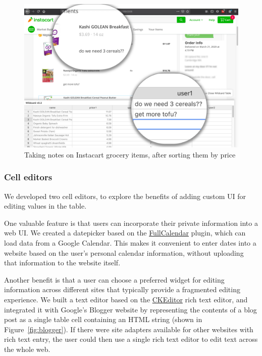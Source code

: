 \documentclass[sigplan,screen,10pt,anonymous,review]{acmart}
\begin{document}
\begin{figure}
\hypertarget{fig:instacart}{%
\centering
\includegraphics[width=\columnwidth]{media/instacart.png}
\caption{Taking notes on Instacart grocery items, after sorting them by price}\label{fig:instacart}
}
\end{figure}

\hypertarget{cell-editors}{%
\subsubsection{Cell editors}\label{cell-editors}}

We developed two cell editors, to explore the benefits of adding custom
UI for editing values in the table.

One valuable feature is that users can incorporate their private
information into a web UI. We created a datepicker based on the
\href{https://fullcalendar.io/}{FullCalendar} plugin, which can load
data from a Google Calendar. This makes it convenient to enter dates
into a website based on the user's personal calendar information,
without uploading that information to the website itself.

Another benefit is that a user can choose a preferred widget for editing
information across different sites that typically provide a fragmented
editing experience. We built a text editor based on the
\href{https://ckeditor.com/}{CKEditor} rich text editor, and integrated
it with Google's Blogger website by representing the contents of a blog
post as a single table cell containing an HTML string (shown in
Figure~\ref{fig:blogger}). If there were site adapters available for
other websites with rich text entry, the user could then use a single
rich text editor to edit text across the whole web.
\end{document}
